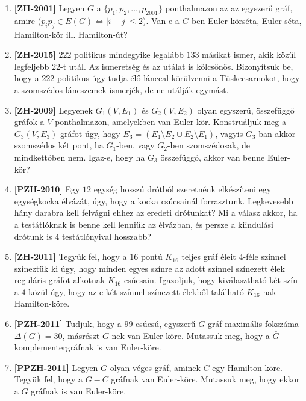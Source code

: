 \documentclass[a4paper,12pt]{article}
\begin{document}
\begin{enumerate}
            \item \textbf{[ZH-2001]} Legyen $G$ a $\{p_1, p_2, \ldots, p_{2001}\}$ ponthalmazon az az egyszerű gráf, amire ($p_i p_j \in E(G) \Leftrightarrow |i-j| \le 2$). Van-e a $G$-ben Euler-körséta, Euler-séta, Hamilton-kör ill. Hamilton-út?
            
            \item \textbf{[ZH-2015]} $222$ politikus mindegyike legalább $133$ másikat ismer, akik közül legfeljebb $22$-t utál. Az ismeretség és az utálat is kölcsönös. Bizonyítsuk be, hogy a $222$ politikus úgy tudja élő lánccal körülvenni a Tüskecsarnokot, hogy a szomszédos láncszemek ismerjék, de ne utálják egymást.

            \item \textbf{[ZH-2009]} Legyenek $G_1(V,E_1)$ és $G_2(V,E_2)$ olyan egyszerű, összefüggő gráfok a $V$ ponthalmazon, amelyekben van Euler-kör. Konstruáljuk meg a $G_3(V,E_3)$ gráfot úgy, hogy $E_3=(E_1\setminus E_2 \cup E_2 \setminus E_1)$, vagyis $G_3$-ban akkor szomszédos két pont, ha $G_1$-ben, vagy $G_2$-ben szomszédosak, de mindkettőben nem. Igaz-e, hogy ha $G_3$ összefüggő, akkor van benne Euler-kör?


            \item \textbf{[PZH-2010]} Egy $12$ egység hosszú drótból szeretnénk elkészíteni egy egységkocka élvázát, úgy, hogy a kocka csúcsainál forrasztunk. Legkevesebb hány darabra kell felvágni ehhez az eredeti drótunkat? Mi a válasz akkor, ha a testátlóknak is benne kell lenniük az élvázban, és persze a kiindulási drótunk is $4$ testátlónyival hosszabb?

            \item \textbf{[ZH-2011]} Tegyük fel, hogy a $16$ pontú $K_{16}$ teljes gráf éleit $4$-féle színnel színeztük ki úgy, hogy minden egyes színre az adott színnel színezett élek reguláris gráfot alkotnak $K_{16}$ csúcsain. Igazoljuk, hogy kiválasztható két szín a $4$ közül úgy, hogy az e két színnel színezett élekből található $K_{16}$-nak Hamilton-köre.

            \item \textbf{[PZH-2011]} Tudjuk, hogy a $99$ csúcsú, egyszerű $G$ gráf maximális fokszáma $\Delta(G)=30$, másrészt $G$-nek van Euler-köre. Mutassuk meg, hogy a $\bar{G}$ komplementergráfnak is van Euler-köre.

            \item \textbf{[PPZH-2011]} Legyen $G$ olyan véges gráf, aminek $C$ egy Hamilton köre. Tegyük fel, hogy a $G-C$ gráfnak van Euler-köre. Mutassuk meg, hogy ekkor a $G$ gráfnak is van Euler-köre.


\end{enumerate}
\end{document}
